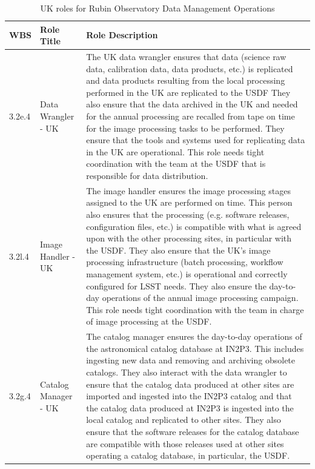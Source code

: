\normalsize \begin{longtable} {|p{}|p{}|p{}|} \caption{UK roles for Rubin Observatory Data Management Operations \label{tab:ukdfroles}}\\ 
\hline 
\textbf{WBS}&\textbf{Role Title}&\textbf{Role Description} \\ \hline
{3.2e.4}&{Data Wrangler - UK}&{The UK data wrangler ensures that data (science raw data, calibration data, data products, etc.) is replicated and data products resulting from the local processing performed in the UK are replicated to the USDF They also ensure that the data archived in the UK and needed for the annual processing are recalled from tape on time for the image processing tasks to be performed. They ensure that the tools and systems used for replicating data in the UK are operational. This role needs tight coordination with the team at the USDF that is responsible for data distribution.} \\ \hline
{3.2l.4}&{Image Handler - UK}&{The image handler ensures the image processing stages assigned to the UK are performed on time. This person also ensures that the processing (e.g. software releases, configuration files, etc.) is compatible with what is agreed upon with the other processing sites, in particular with the USDF. They also ensure that the UK's image processing infrastructure (batch processing, workflow management system, etc.) is operational and correctly configured for LSST needs. They also ensure the day-to-day operations of the annual image processing campaign. This role needs tight coordination with the team in charge of image processing at the USDF.} \\ \hline
{3.2g.4}&{Catalog Manager - UK}&{The catalog manager ensures the day-to-day operations of the astronomical catalog database at IN2P3. This includes ingesting new data and removing and archiving obsolete catalogs. They also interact with the data wrangler to ensure that the catalog data produced at other sites are imported and ingested into the IN2P3 catalog and that the catalog data produced at IN2P3 is ingested into the local catalog and replicated to other sites. They also ensure that the software releases for the catalog database are compatible with those releases used at other sites operating a catalog database, in particular, the USDF.} \\ \hline
\end{longtable} \normalsize
